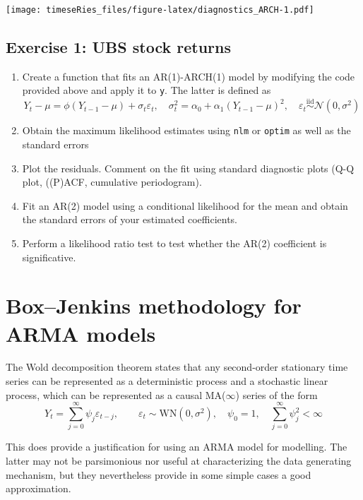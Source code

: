 \documentclass[]{book}
\providecommand{\tightlist}{%
  \setlength{\itemsep}{0pt}\setlength{\parskip}{0pt}}
\begin{document}
\texttt{[image: timeseRies\_files/figure-latex/diagnostics\_ARCH-1.pdf]}

\subsection{Exercise 1: UBS stock
returns}\label{exercise-1-ubs-stock-returns}

\begin{enumerate}
\def\labelenumi{\arabic{enumi}.}
\tightlist
\item
  Create a function that fits an AR(1)-ARCH(1) model by modifying the
  code provided above and apply it to \texttt{y}. The latter is defined
  as
  \[Y_t-\mu = \phi(Y_{t-1}-\mu)+\sigma_t\varepsilon_t, \quad \sigma^2_t = \alpha_0+\alpha_1(Y_{t-1}-\mu)^2, \quad \varepsilon_t \stackrel{\mathrm{iid}}{\sim} \mathcal{N}(0,\sigma^2)\]
\item
  Obtain the maximum likelihood estimates using \texttt{nlm} or
  \texttt{optim} as well as the standard errors
\item
  Plot the residuals. Comment on the fit using standard diagnostic plots
  (Q-Q plot, ((P)ACF, cumulative periodogram).
\item
  Fit an AR(2) model using a conditional likelihood for the mean and
  obtain the standard errors of your estimated coefficients.
\item
  Perform a likelihood ratio test to test whether the AR(2) coefficient
  is significative.
\end{enumerate}

\section{Box--Jenkins methodology for ARMA
models}\label{boxjenkins-methodology-for-arma-models}

The Wold decomposition theorem states that any second-order stationary
time series can be represented as a deterministic process and a
stochastic linear process, which can be represented as a causal
MA(\(\infty\)) series of the form
\[Y_t = \sum_{j = 0}^\infty \psi_j\varepsilon_{t-j}, \qquad \varepsilon_t \sim \mathrm{WN}(0, \sigma^2),\quad \psi_0 = 1, \quad\sum_{j = 0}^\infty \psi_j^2 < \infty\]

This does provide a justification for using an ARMA model for modelling.
The latter may not be parsimonious nor useful at characterizing the data
generating mechanism, but they nevertheless provide in some simple cases
a good approximation.
\end{document}
